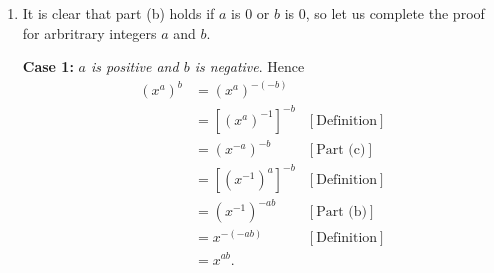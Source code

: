 \begin{enumerate}
\begin{enumerate}
               Thus \eqref{1_1_19_2} holds for each integer $m$. Finally, we
               will show by induction on $n$ that
               $x^{a - n} = x^ax^{-n}$. Equality \eqref{1_1_19_2} says that our 
               statement holds for $n = 1$. So assume that
               $x^{a - k} = x^ax^{-k}$ for some positive integer $k$. Thus
               \begin{align*}
                  x^{a - (k+1)} &= x^{(a - k) - 1}  \\
                             &= x^{a-k}x^{-1} &\text{[\eqref{1_1_19_2}]} \\
                             &= x^ax^{-k}x^{-1} &\text{[Inductive Hypothesis]}\\
                             &= x^a(x^{-1})^kx^{-1}&\text{[Definition]} \\
                             &= x^a(x^{-1})^{k+1} &\text{[Definition]} \\
                             &= x^ax^{-(k+1)}, &\text{[Definition]} \\
               \end{align*}
               so that $x^{a - n} = x^ax^{-n}$ holds for each positive integer
               $n$ by induction; particularly,
               $$x^{a + b} = x^{a - s} = x^ax^{-s} = x^ax^b,$$
               where $s = -b$ (i.e., $s$ is positive). We have thus shown that
               \eqref{1_1_19_1} holds for all integers $a$ and $b$. \qed
         \item It is clear that part (b) holds if $a$ is 0 or $b$ is 0, so let
               us complete the proof for arbritrary integers $a$ and $b$.

               \textbf{Case 1:} \textit{$a$ is positive and $b$ is negative}. 
               Hence
               \begin{align*}
                  (x^a)^b &= (x^a)^{-(-b)} \\
                          &= [(x^a)^{-1}]^{-b} &[\text{Definition}] \\
                          &= (x^{-a})^{-b} &[\text{Part (c)}] \\
                          &= [(x^{-1})^a]^{-b} &[\text{Definition}] \\
                          &= (x^{-1})^{-ab} &[\text{Part (b)}] \\
                          &= x^{-(-ab)} &[\text{Definition}] \\
                          &= x^{ab}.
               \end{align*}


\end{enumerate}
\end{enumerate}

